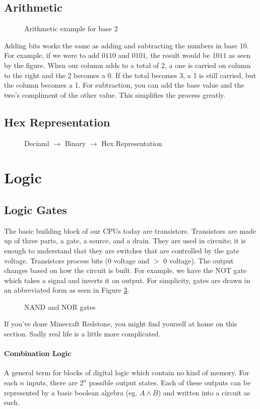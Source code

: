 \subsection{Arithmetic}
\begin{figure}[!htb]
	\caption{\label{fig:adding} Arithmetic example for base 2}
\end{figure}
Adding bits works the same as adding and subtracting the numbers in base 10. For example, if we were to add $0110$ and $0101$, the result would be $1011$ as seen by the figure. When our column adds to a total of 2, a one is carried on column to the right and the 2 becomes a 0. If the total becomes 3, a 1 is still carried, but the column becomes a 1.
For subtraction, you can add the base value and the two's compliment of the other value. This simplifies the process greatly.
\newpage
\subsection{Hex Representation}
\begin{figure}[!htb]
	\caption{\label{fig:adding} Deciaml $\rightarrow$ Binary $\rightarrow$ Hex Representation}
\end{figure}
\section{Logic}
\subsection{Logic Gates}
The basic building block of our CPUs today are transistors. Transistors are made up of three parts, a gate, a source, and a drain. They are used in circuits; it is enough to understand that they are switches that are controlled by the gate voltage.
Transistors process bits (0 voltage and $>$ 0 voltage). The output changes based on how the circuit is built. For example, we have the NOT gate which takes a signal and inverts it on output. For simplicity, gates are drawn in an abbreviated form as seen in Figure \ref{fig:gates}.
\begin{figure}[!htb]
	\caption{\label{fig:gates} NAND and NOR gates}
\end{figure}
If you've done Minecraft Redstone, you might find yourself at home on this section. Sadly real life is a little more complicated.
\paragraph{Combination Logic} A general term for blocks of digital logic which contain no kind of memory. For each $n$ inputs, there are $2^n$ possible output states. Each of these outputs can be represented by a basic boolean algebra (eg. $A\wedge B$) and written into a circuit as such.
